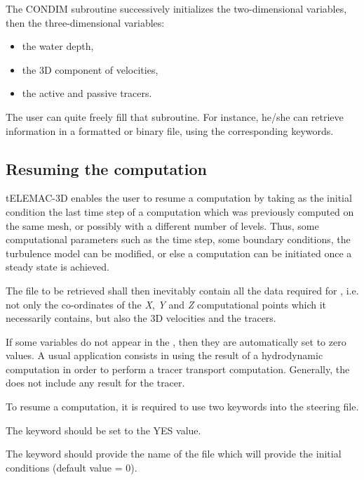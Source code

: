 The CONDIM subroutine successively initializes the two-dimensional
variables, then the three-dimensional variables:

\begin{itemize}
\item the water depth,

\item the 3D component of velocities,

\item the active and passive tracers.
\end{itemize}

The user can quite freely fill that subroutine. For instance, he/she can
retrieve information in a formatted or binary file, using the corresponding
keywords.


\subsection{Resuming the computation}

tELEMAC-3D enables the user to resume a computation by taking as the initial
condition the last time step of a computation which was previously computed on
the same mesh, or possibly with a different number of levels. Thus, some
computational parameters such as the time step, some boundary conditions, the
turbulence model can be modified, or else a computation can be initiated once a
steady state is achieved.

The file to be retrieved shall then inevitably contain all the data required
for , i.e. not only the co-ordinates of the \textit{X}, \textit{Y}
and \textit{Z} computational points which it necessarily contains, but also the
3D velocities and the tracers.

If some variables do not appear in the , then they are automatically set to zero values.  A usual application
consists in using the result of a hydrodynamic computation in order to perform
a tracer transport computation. Generally, the  does not include any result for the tracer.

To resume a computation, it is required to use two keywords into the steering
file.

The keyword should be set to the YES value.

The keyword  should provide the name of the
file which will provide the initial conditions (default value = 0).

